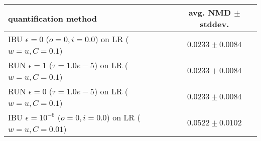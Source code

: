 \begin{tabular}{lc}
  \toprule
  quantification method & avg. NMD $\pm$ stddev. \\
  \midrule
  IBU $\epsilon=0$ ($o=0, i=0.0$) on LR ($w=u, C=0.1$) & $\mathbf{0.0233 \pm 0.0084}$ \\
  RUN $\epsilon=1$ ($\tau=1.0e-5$) on LR ($w=u, C=0.1$) & $0.0233 \pm 0.0084$ \\
  RUN $\epsilon=0$ ($\tau=1.0e-5$) on LR ($w=u, C=0.1$) & $0.0233 \pm 0.0084$ \\
  IBU $\epsilon=10^{-6}$ ($o=0, i=0.0$) on LR ($w=u, C=0.01$) & $0.0522 \pm 0.0102$ \\
  \bottomrule
\end{tabular}
